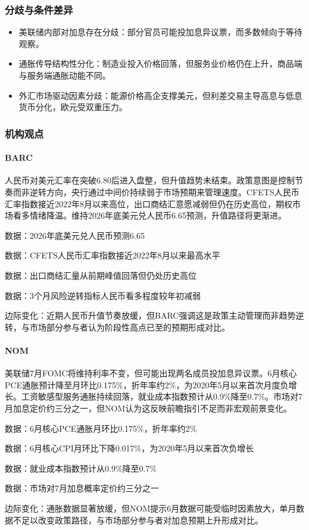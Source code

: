 \documentclass[11pt]{ctexart}
\begin{document}
\subsubsection*{分歧与条件差异}
\begin{itemize}
  \item 美联储内部对加息存在分歧：部分官员可能投加息异议票，而多数倾向于等待观察。
  \item 通胀传导结构性分化：制造业投入价格回落，但服务业价格仍在上升，商品端与服务端通胀动能不同。
  \item 外汇市场驱动因素分歧：能源价格高企支撑美元，但利差交易主导高息与低息货币分化，欧元受双重压力。
\end{itemize}
\subsubsection*{机构观点}
\paragraph{BARC} 人民币对美元汇率在突破6.80后进入盘整，但升值趋势未结束。政策意图是控制节奏而非逆转方向，央行通过中间价持续弱于市场预期来管理速度。CFETS人民币汇率指数接近2022年8月以来高位，出口商结汇意愿减弱但仍在历史高位，期权市场看多情绪降温。维持2026年底美元兑人民币6.65预测，升值路径将更渐进。
{\small\color{refgray}数据：2026年底美元兑人民币预测6.65\par}
{\small\color{refgray}数据：CFETS人民币汇率指数接近2022年8月以来最高水平\par}
{\small\color{refgray}数据：出口商结汇量从前期峰值回落但仍处历史高位\par}
{\small\color{refgray}数据：3个月风险逆转指标人民币看多程度较年初减弱\par}
{\small\color{refgray}边际变化：近期人民币升值节奏放缓，但BARC强调这是政策主动管理而非趋势逆转，与市场部分参与者认为阶段性高点已至的预期形成对比。\par}
\paragraph{NOM} 美联储7月FOMC将维持利率不变，但可能出现两名成员投加息异议票。6月核心PCE通胀预计降至月环比0.175\%，折年率约2\%，为2020年5月以来首次月度负增长。工资敏感型服务通胀持续回落，就业成本指数预计从0.9\%降至0.7\%。市场对7月加息定价约三分之一，但NOM认为这反映前瞻指引不足而非宏观前景变化。
{\small\color{refgray}数据：6月核心PCE通胀月环比0.175\%，折年率约2\%\par}
{\small\color{refgray}数据：6月核心CPI月环比下降0.017\%，为2020年5月以来首次负增长\par}
{\small\color{refgray}数据：就业成本指数预计从0.9\%降至0.7\%\par}
{\small\color{refgray}数据：市场对7月加息概率定价约三分之一\par}
{\small\color{refgray}边际变化：通胀数据显著放缓，但NOM提示6月数据可能受临时因素放大，单月数据不足以改变政策路径，与市场部分参与者对加息预期上升形成对比。\par}
\end{document}
